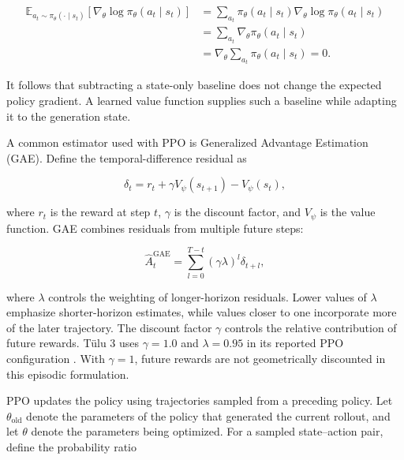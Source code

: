 \begin{align}
    \mathbb{E}_{a_t\sim\pi_\theta(\cdot\mid s_t)}
    \left[
        \nabla_\theta\log\pi_\theta(a_t\mid s_t)
    \right]
    &=
    \sum_{a_t}
    \pi_\theta(a_t\mid s_t)
    \nabla_\theta\log\pi_\theta(a_t\mid s_t)
    \nonumber\\
    &=
    \sum_{a_t}
    \nabla_\theta\pi_\theta(a_t\mid s_t)
    \nonumber\\
    &=
    \nabla_\theta
    \sum_{a_t}\pi_\theta(a_t\mid s_t)
    =0.
    \label{eq:rlvr-baseline-zero}
\end{align}

It follows that subtracting a state-only baseline does not change the
expected policy gradient. A learned value function supplies such a baseline
while adapting it to the generation state.

A common estimator used with PPO is Generalized Advantage Estimation (GAE).
Define the temporal-difference residual as

\begin{equation}
    \delta_t
    =
    r_t+\gamma V_\psi(s_{t+1})-V_\psi(s_t),
    \label{eq:rlvr-td-residual}
\end{equation}

where \(r_t\) is the reward at step \(t\), \(\gamma\) is the discount factor,
and \(V_\psi\) is the value function. GAE combines residuals from multiple
future steps:

\begin{equation}
    \widehat{A}^{\mathrm{GAE}}_t
    =
    \sum_{l=0}^{T-t}
    (\gamma\lambda)^l\delta_{t+l},
    \label{eq:rlvr-gae}
\end{equation}

where \(\lambda\) controls the weighting of longer-horizon residuals. Lower
values of \(\lambda\) emphasize shorter-horizon estimates, while values
closer to one incorporate more of the later trajectory. The discount factor
\(\gamma\) controls the relative contribution of future rewards. Tülu 3 uses
\(\gamma=1.0\) and \(\lambda=0.95\) in its reported PPO configuration
\parencite{lambert2025tulu3}. With \(\gamma=1\), future rewards are not
geometrically discounted in this episodic formulation.

PPO updates the policy using trajectories sampled from a preceding policy.
Let \(\theta_{\mathrm{old}}\) denote the parameters of the policy that
generated the current rollout, and let \(\theta\) denote the parameters being
optimized. For a sampled state--action pair, define the probability ratio

